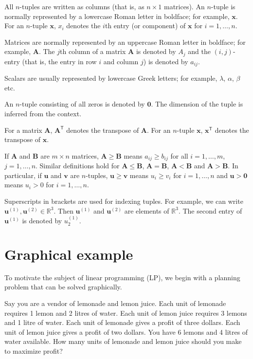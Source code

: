 \documentclass[]{book}
\def\lt{<}
\def\gt{>}
\newcommand{\RR}{\mathbb{R}}
\newcommand{\mm}[1]{\mathbf{#1}}
\renewcommand{\vec}[1]{\mathbf{#1}}
\theoremstyle{definition}
\theoremstyle{definition}
\theoremstyle{remark}
\begin{document}
All \(n\)-tuples are written as columns (that is, as \(n\times 1\)
matrices). An \(n\)-tuple is normally represented by a lowercase Roman
letter in boldface; for example, \(\vec{x}\). For an \(n\)-tuple
\(\vec{x}\), \(x_i\) denotes the \(i\)th entry (or component) of
\(\vec{x}\) for \(i = 1,\ldots, n\).

Matrices are normally represented by an uppercase Roman letter in
boldface; for example, \(\mm{A}\). The \(j\)th column of a matrix
\(\mm{A}\) is denoted by \(A_j\) and the \((i,j)\)-entry (that is, the
entry in row \(i\) and column \(j\)) is denoted by \(a_{ij}\).

Scalars are usually represented by lowercase Greek letters; for example,
\(\lambda\), \(\alpha\), \(\beta\) etc.

An \(n\)-tuple consisting of all zeros is denoted by \(\vec{0}\). The
dimension of the tuple is inferred from the context.

For a matrix \(\mm{A}\), \(\mm{A}^\mathsf{T}\) denotes the transpose of
\(\mathbf{A}\). For an \(n\)-tuple \(\mathbf{x}\),
\(\mathbf{x}^\mathsf{T}\) denotes the transpose of \(\mathbf{x}\).

If \(\mm{A}\) and \(\mm{B}\) are \(m\times n\) matrices,
\(\mm{A} \geq \mm{B}\) means \(a_{ij} \geq b_{ij}\) for all
\(i = 1,\ldots, m\), \(j = 1,\ldots, n\). Similar definitions hold for
\(\mm{A} \leq \mm{B}\), \(\mm{A} = \mm{B}\), \(\mm{A} \lt \mm{B}\) and
\(\mm{A} \gt \mm{B}\). In particular, if \(\vec{u}\) and \(\vec{v}\) are
\(n\)-tuples, \(\vec{u}\geq \vec{v}\) means \(u_i \geq v_i\) for
\(i= 1,\ldots, n\) and \(\vec{u} \gt \vec{0}\) means \(u_i \gt 0\) for
\(i = 1,\ldots,n\).

Superscripts in brackets are used for indexing tuples. For example, we
can write \(\vec{u}^{(1)},\vec{u}^{(2)} \in \RR^3\). Then
\(\vec{u}^{(1)}\) and \(\vec{u}^{(2)}\) are elements of \(\RR^3\). The
second entry of \(\vec{u}^{(1)}\) is denoted by \(u^{(1)}_2.\)

\chapter{Graphical example}\label{graphic}

To motivate the subject of linear programming (LP), we begin with a
planning problem that can be solved graphically.

Say you are a vendor of lemonade and lemon juice. Each unit of lemonade
requires 1 lemon and 2 litres of water. Each unit of lemon juice
requires 3 lemons and 1 litre of water. Each unit of lemonade gives a
profit of three dollars. Each unit of lemon juice gives a profit of two
dollars. You have 6 lemons and 4 litres of water available. How many
units of lemonade and lemon juice should you make to maximize profit?
\end{document}
